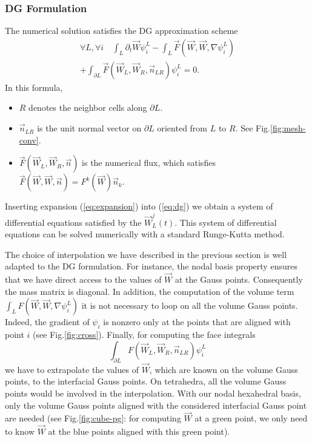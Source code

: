 \documentclass{svmult}
\begin{document}
%

\subsubsection{DG Formulation}
The numerical solution satisfies the DG approximation scheme
\begin{eqnarray}
  \forall L,\forall i\quad\int_{L}\partial_{t}\vec{W}\psi_{i}^{L}-\int_{L}\vec{F}(\vec{W},\vec{W},\nabla\psi_{i}^{L}) \nonumber \\
+\int_{\partial L}\vec{F}(\vec{W}_{L},\vec{W}_{R},\vec{n}_{LR})\psi_{i}^{L}=0.
\label{eq:dg}
\end{eqnarray}
In this formula,
\begin{itemize}
\item $R$ denotes the neighbor cells along $\partial L$.
\item $\vec{n}_{LR}$ is the unit normal vector on $\partial L$
  oriented from $L$ to $R$. See Fig.\ref{fig:mesh-conv}.
\item $\vec{F}(\vec{W}_{L},\vec{W}_{R},\vec{n})$ is the numerical
  flux, which satisfies
  $\vec{F}(\vec{W},\vec{W},\vec{n})=F^{k}(\vec{W})\vec{n}_{k}$.
\end{itemize}

Inserting expansion (\ref{eq:expansion}) into (\ref{eq:dg}) we obtain
a system of differential equations satisfied by the
$\vec{W}_{L}^{j}(t)$. This system of differential equations can be
solved numerically with a standard Runge-Kutta method.

The choice of interpolation we have described in the previous section
is well adapted to the DG formulation.  For instance, the nodal basis
property ensures that we have direct access to the values of $\vec{W}$
at the Gauss points. Consequently the mass matrix is diagonal. In
addition, the computation of the volume term $
\int_{L}F(\vec{W},\vec{W},\nabla\psi_{i}^{L})$ it is not necessary to
loop on all the volume Gauss points. Indeed, the gradient of
$\psi_{i}$ is nonzero only at the points that are aligned with point
$i$ (see Fig.\ref{fig:cross}). Finally, for computing the face
integrals \begin{equation}\int_{\partial
    L}F(\vec{W}_{L},\vec{W}_{R},\vec{n}_{LR})\psi_{i}^{L}\end{equation}
we have to extrapolate the values of $\vec{W}$, which are known on the
volume Gauss points, to the interfacial Gauss points. On tetrahedra,
all the volume Gauss points would be involved in the
interpolation. With our nodal hexahedral basis, only the volume Gauss
points aligned with the considered interfacial Gauss point are needed
(see Fig.\ref{fig:cube-pg}: for computing $\vec{W}$ at a green point,
we only need to know $\vec{W}$ at the blue points aligned with this
green point).
\end{document}
